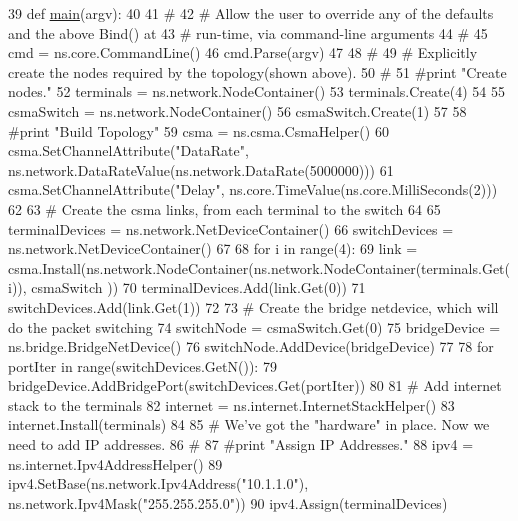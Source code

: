 \begin{DoxyCode}
39 \textcolor{keyword}{def }\hyperlink{namespacecsma-bridge_a25d9f9cff8393751f7263e818d74a1e2}{main}(argv):
40 
41     \textcolor{comment}{#}
42     \textcolor{comment}{# Allow the user to override any of the defaults and the above Bind() at}
43     \textcolor{comment}{# run-time, via command-line arguments}
44     \textcolor{comment}{#}
45     cmd = ns.core.CommandLine()
46     cmd.Parse(argv)
47 
48     \textcolor{comment}{#}
49     \textcolor{comment}{# Explicitly create the nodes required by the topology(shown above).}
50     \textcolor{comment}{#}
51     \textcolor{comment}{#print "Create nodes."}
52     terminals = ns.network.NodeContainer()
53     terminals.Create(4)
54 
55     csmaSwitch = ns.network.NodeContainer()
56     csmaSwitch.Create(1)
57 
58     \textcolor{comment}{#print "Build Topology"}
59     csma = ns.csma.CsmaHelper()
60     csma.SetChannelAttribute(\textcolor{stringliteral}{"DataRate"}, ns.network.DataRateValue(ns.network.DataRate(5000000)))
61     csma.SetChannelAttribute(\textcolor{stringliteral}{"Delay"}, ns.core.TimeValue(ns.core.MilliSeconds(2)))
62 
63     \textcolor{comment}{# Create the csma links, from each terminal to the switch}
64 
65     terminalDevices = ns.network.NetDeviceContainer()
66     switchDevices = ns.network.NetDeviceContainer()
67 
68     \textcolor{keywordflow}{for} i \textcolor{keywordflow}{in} range(4):
69         link = csma.Install(ns.network.NodeContainer(ns.network.NodeContainer(terminals.Get(i)), csmaSwitch
      ))
70         terminalDevices.Add(link.Get(0))
71         switchDevices.Add(link.Get(1))
72 
73     \textcolor{comment}{# Create the bridge netdevice, which will do the packet switching}
74     switchNode = csmaSwitch.Get(0)
75     bridgeDevice = ns.bridge.BridgeNetDevice()
76     switchNode.AddDevice(bridgeDevice)
77 
78     \textcolor{keywordflow}{for} portIter \textcolor{keywordflow}{in} range(switchDevices.GetN()):
79         bridgeDevice.AddBridgePort(switchDevices.Get(portIter))
80 
81     \textcolor{comment}{# Add internet stack to the terminals}
82     internet = ns.internet.InternetStackHelper()
83     internet.Install(terminals)
84 
85     \textcolor{comment}{# We've got the "hardware" in place.  Now we need to add IP addresses.}
86     \textcolor{comment}{#}
87     \textcolor{comment}{#print "Assign IP Addresses."}
88     ipv4 = ns.internet.Ipv4AddressHelper()
89     ipv4.SetBase(ns.network.Ipv4Address(\textcolor{stringliteral}{"10.1.1.0"}), ns.network.Ipv4Mask(\textcolor{stringliteral}{"255.255.255.0"}))
90     ipv4.Assign(terminalDevices)

\end{DoxyCode}
